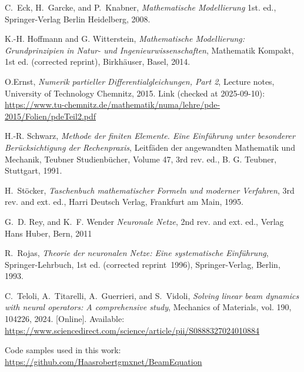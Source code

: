 \documentclass[a4paper,11pt]{article}
\begin{document}
\newpage
\begin{thebibliography}{9}

C.~Eck, H.~Garcke, and P.~Knabner,
\emph{Mathematische Modellierung}
1st. ed., Springer-Verlag Berlin Heidelberg, 2008.

K.-H. Hoffmann and G. Witterstein, 
\emph{Mathematische Modellierung: Grundprinzipien in Natur- und Ingenieurwissenschaften}, 
Mathematik Kompakt, 1st ed. (corrected reprint), Birkhäuser, Basel, 2014.

O.Ernst,
\emph{Numerik partieller Differentialgleichungen, Part 2}, 
Lecture notes, University of Technology Chemnitz, 2015.
Link (checked at 2025-09-10): \url{https://www.tu-chemnitz.de/mathematik/numa/lehre/pde-2015/Folien/pdeTeil2.pdf}

H.-R. Schwarz,
\emph{Methode der finiten Elemente. Eine Einführung unter besonderer Berücksichtigung der Rechenpraxis},
Leitfäden der angewandten Mathematik und Mechanik, Teubner Studienbücher, Volume 47, 3rd rev. ed., B. G. Teubner, Stuttgart, 1991.

H.~Stöcker, 
\emph{Taschenbuch mathematischer Formeln und moderner Verfahren}, 
3rd rev. and ext. ed., Harri Deutsch Verlag, Frankfurt am Main, 1995.

G.~D. Rey, and K.~F. Wender
\emph{Neuronale Netze}, 
2nd rev. and ext. ed., Verlag Hans Huber, Bern, 2011

R.~Rojas,
\emph{Theorie der neuronalen Netze: Eine systematische Einführung},
Springer-Lehrbuch, 1st ed. (corrected reprint 1996), Springer-Verlag, Berlin, 1993.



C.~Teloli, A.~Titarelli, A.~Guerrieri, and S.~Vidoli, 
\emph{Solving linear beam dynamics with neural operators: A comprehensive study}, 
Mechanics of Materials, vol. 190, 104226, 2024. [Online]. Available: \url{https://www.sciencedirect.com/science/article/pii/S0888327024010884}

\begin{comment}
\bibitem{timoshenko1951theory}
S.~P. Timoshenko and J.~M. Gere, 
\emph{Theory of Elastic Stability}, 
2nd ed., McGraw-Hill, New York, 1961.
\end{comment}

Code samples used in this work: \url{https://github.com/Haasrobertgmxnet/BeamEquation}

\end{thebibliography}


\newpage

\end{document}
